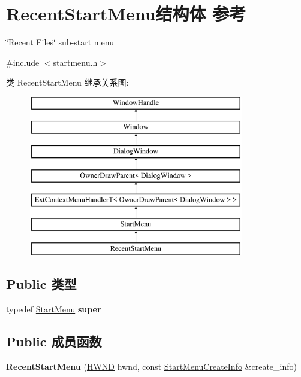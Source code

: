 \hypertarget{struct_recent_start_menu}{}\section{Recent\+Start\+Menu结构体 参考}
\label{struct_recent_start_menu}


\char`\"{}\+Recent Files\char`\"{} sub-\/start menu  




{\ttfamily \#include $<$startmenu.\+h$>$}

类 Recent\+Start\+Menu 继承关系图\+:\begin{figure}[H]
\begin{center}
\leavevmode
\includegraphics[height=7.000000cm]{struct_recent_start_menu}
\end{center}
\end{figure}
\subsection*{Public 类型}
\begin{DoxyCompactItemize}
\item 
\mbox{\label{struct_recent_start_menu_a708e2123be8f773dfbc85b95a6f9486c}} 
typedef \hyperlink{struct_start_menu}{Start\+Menu} {\bfseries super}
\end{DoxyCompactItemize}
\subsection*{Public 成员函数}
\begin{DoxyCompactItemize}
\item 
\mbox{\label{struct_recent_start_menu_afb159d05e2abd2ca762b764d9182a808}} 
{\bfseries Recent\+Start\+Menu} (\hyperlink{interfacevoid}{H\+W\+ND} hwnd, const \hyperlink{struct_start_menu_create_info}{Start\+Menu\+Create\+Info} \&create\+\_\+info)
\end{DoxyCompactItemize}
